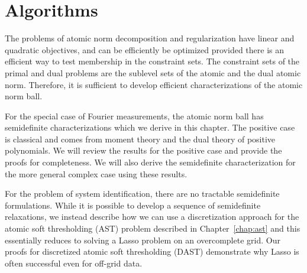 \chapter{Algorithms}
\label{chap:algos}

The problems of atomic norm decomposition and regularization have linear and
quadratic objectives, and can be efficiently be optimized provided there is an
efficient way to test membership in the constraint sets. The constraint sets of
the primal and dual problems are the sublevel sets of the atomic and the dual
atomic norm. Therefore, it is sufficient to develop efficient characterizations
of the atomic norm ball.

For the special case of Fourier measurements, the atomic norm ball has
semidefinite characterizations which we derive in this chapter. The positive
case is classical and comes from moment theory and the dual theory of positive
polynomials. We will review the results for the positive case and provide the
proofs for completeness. We will also derive the semidefinite characterization
for the more general complex case using these results.

For the problem of system identification, there are no tractable semidefinite
formulations. While it is possible to develop a sequence of semidefinite
relaxations, we instead describe how we can use a discretization approach for
the atomic soft thresholding (AST) problem described in Chapter~\ref{chap:ast}
and this essentially reduces to solving a Lasso problem on an overcomplete grid.
Our proofs for discretized atomic soft thresholding (DAST) demonstrate why Lasso
is often successful even for off-grid data.

